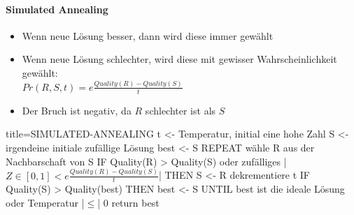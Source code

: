 \documentclass[
    ngerman,
    color=3b,
    dark_mode,
    load_common, %
    summary,
    boxarc,
]{tuda_summary}
\begin{document}
\clearpage

\paragraph{Simulated Annealing}\mbox{}
\begin{idea}\mbox{}
    \begin{itemize}
        \item Wenn neue Lösung besser, dann wird diese immer gewählt
        \item Wenn neue Lösung schlechter, wird diese mit gewisser Wahrscheinlichkeit gewählt: \\
              $Pr(R,S,t) = e \frac{Quality(R)-Quality(S)}{t}$
        \item Der Bruch ist negativ, da $R$ schlechter ist als $S$
    \end{itemize}
\end{idea}
\begin{codeBlock}[autogobble,escapeinside=||]{title={SIMULATED-ANNEALING}}
    t <- Temperatur, initial eine hohe Zahl
    S <- irgendeine initiale zufällige Lösung
    best <- S
    REPEAT
        wähle R aus der Nachbarschaft von S
        IF Quality(R) > Quality(S) oder zufälliges
                    |$ Z \in [0,1] < e \frac{Quality(R)-Quality(S)}{t}$| THEN
                S <- R
        dekrementiere t
        IF Quality(S) > Quality(best) THEN
            best <- S 
    UNTIL best ist die ideale Lösung oder Temperatur |$\leq$| 0
    return best
\end{codeBlock}
\vspace{-1em}
\end{document}

